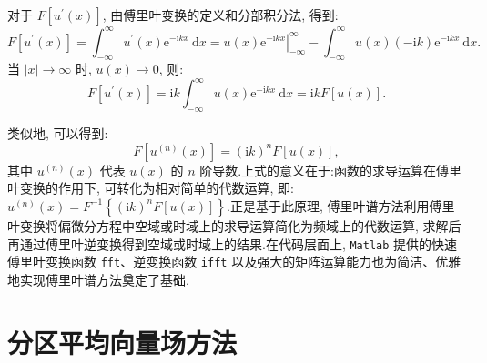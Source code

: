 对于 $F\left[u^{\prime}(x)\right]$, 由傅里叶变换的定义和分部积分法, 得到:
\begin{equation}
    F\left[u^{\prime}(x)\right] = \int_{-\infty}^{\infty} u^{\prime}(x) \mathrm{e}^{-\mathrm{i} k x} \mathrm{~d} x = \left.u(x) \mathrm{e}^{-\mathrm{i} k x}\right|_{-\infty}^{\infty} - \int_{-\infty}^{\infty} u(x)(-\mathrm{i} k) \mathrm{e}^{-\mathrm{i} k x} \mathrm{~d} x. \label{eq:3-7}
\end{equation}
当 $\mid x\mid  \rightarrow \infty$ 时, $u(x) \rightarrow 0$, 则:
\begin{equation}
    F\left[u^{\prime}(x)\right] = \mathrm{i} k \int_{-\infty}^{\infty} u(x) \mathrm{e}^{-\mathrm{i} k x} \mathrm{~d} x = \mathrm{i} k F[u(x)]. \label{eq:3-8}
\end{equation}

类似地, 可以得到:
\begin{equation}
    F\left[u^{(n)}(x)\right] = (\mathrm{i} k)^n F[u(x)], \label{eq:3-9}
\end{equation}
其中 $u^{(n)}(x)$ 代表 $u(x)$ 的 $n$ 阶导数.上式的意义在于:函数的求导运算在傅里叶变换的作用下, 可转化为相对简单的代数运算, 即: $u^{(n)}(x) = F^{-1}\left\{(\mathrm{i} k)^n F[u(x)]\right\}$.正是基于此原理, 傅里叶谱方法利用傅里叶变换将偏微分方程中空域或时域上的求导运算简化为频域上的代数运算, 求解后再通过傅里叶逆变换得到空域或时域上的结果.在代码层面上, \texttt{Matlab} 提供的快速傅里叶变换函数 \texttt{fft}、逆变换函数 \texttt{ifft} 以及强大的矩阵运算能力也为简洁、优雅地实现傅里叶谱方法奠定了基础.


\section{分区平均向量场方法}


